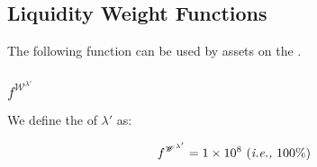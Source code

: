 \documentclass[class=article, crop=false]{standalone}
\begin{document}

\subsection{Liquidity Weight Functions}

The following  function can be used by assets on the .


\subsubsection{$f^{\mathscr{W}^{\lambda'}}$}

We define the  of $\lambda'$ as:

$$
    f^{\mathscr{W}^{\lambda'}} = 1 \times 10^8  \mkern6mu \text{(\textit{i.e.,} 100\%)}
$$
\end{document}
